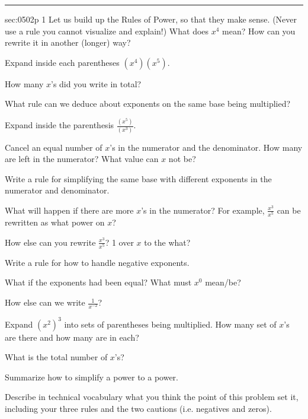\renewcommand{\columnseprule}{1.5pt}
\begin{multicols*}{2}
\rule[0.5\baselineskip]{0.4\textwidth}{1pt}
\noindent
{}\label{sec:0502p}
\begin{exercises}{sec:0502p}
\lab{} 1  Let us build up the Rules of Power, so that they make sense.  (Never use a rule you cannot visualize and explain!)  What does $x^4$ mean?  How can you rewrite it in another (longer) way?

\vspace{2cm}
\lab{}  Expand inside each parentheses  $(x^4)(x^5)$.

\vspace{2cm}
\lab{}  How many $x$’s did you write in total?

\vspace{1cm}
\lab{}  What rule can we deduce about exponents on the same base being multiplied?

\vspace{2cm}
\lab{}  Expand inside the parenthesis $\frac{(x^5)}{(x^3)}$.

\vspace{2cm}
\lab{}  Cancel an equal number of $x$’s in the numerator and the denominator.  How many are left in the numerator?  What value can $x$ not be?

\vspace{2cm}
\lab{} Write a rule for simplifying the same base with different exponents in the numerator and denominator.

\vspace{2cm}
\lab{}  What will happen if there are more $x$’s in the numerator?  For example, $\frac{x^3}{x^5}$ can be rewritten as what power on $x$?

\vspace{2cm}
\lab{} How else can you rewrite $\frac{x^3}{x^5}$?  1 over $x$ to the what?

\vspace{2cm}
\lab{} Write a rule for how to handle negative exponents.

\vspace{2cm}
\lab{} What if the exponents had been equal?  What must $x^0$ mean/be?

\vspace{2cm}
\lab{} How else can we write $\frac{1}{x^{-2}}$?

\vspace{2cm}
\lab{} Expand $(x^2)^3$ into sets of parentheses being multiplied.  How many set of $x$’s are there and how many are in each?

\vspace{2cm}
\lab{} What is the total number of $x$’s?

\vspace{1cm}
\lab{} Summarize how to simplify a power to a power.

\vspace{2cm}
\lab{} Describe in technical vocabulary what you think the point of this problem set it, including your three rules and the two cautions (i.e. negatives and zeros).



\end{exercises}
\end{multicols*}